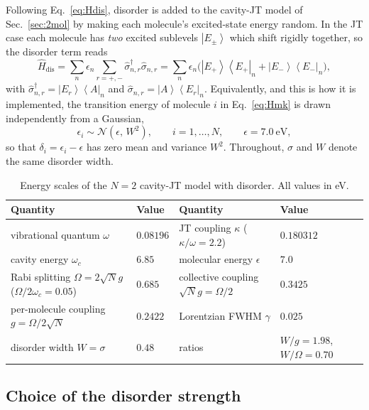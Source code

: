 \documentclass[12pt,a4paper]{article}
\newcommand{\ket}[1]{\left|#1\right\rangle}
\newcommand{\bra}[1]{\left\langle#1\right|}
\begin{document}
Following Eq.~\eqref{eq:Hdis}, disorder is added to the cavity-JT model of
Sec.~\ref{sec:2mol} by making each molecule's excited-state energy random. In
the JT case each molecule has \emph{two} excited sublevels $\ket{E_\pm}$
which shift rigidly together, so the disorder term reads
\begin{equation}
  \hat H_{\mathrm{dis}}=\sum_{n}\epsilon_n\sum_{r=+,-}
    \hat\sigma^\dagger_{n,r}\hat\sigma_{n,r}
  =\sum_n\epsilon_n\big(\ket{E_+}\bra{E_+}_n+\ket{E_-}\bra{E_-}_n\big),
  \label{eq:Hdis_JT}
\end{equation}
with $\hat\sigma^\dagger_{n,r}=\ket{E_r}\bra{A}_n$ and
$\hat\sigma_{n,r}=\ket{A}\bra{E_r}_n$. Equivalently, and this is how it is
implemented, the transition energy of molecule $i$ in Eq.~\eqref{eq:Hmk} is drawn
independently from a Gaussian,
\begin{equation}
  \epsilon_i\sim\mathcal N\!\left(\epsilon,\,W^2\right),\qquad i=1,\dots,N,
  \qquad \epsilon=7.0~\mathrm{eV},
  \label{eq:gauss}
\end{equation}
so that $\delta_i=\epsilon_i-\epsilon$ has zero mean and variance $W^2$.
Throughout, $\sigma$ and $W$ denote the same disorder width.

\begin{table}[t]
\centering
\caption{Energy scales of the $N=2$ cavity-JT model with disorder. All values
in eV.}
\label{tab:scales}
\scriptsize
\begin{tabular}{@{}llll@{}}
\toprule
Quantity & Value & Quantity & Value\\
\midrule
vibrational quantum $\omega$ & $0.08196$ & JT coupling $\kappa$ ($\kappa/\omega=2.2$) & $0.180312$\\
cavity energy $\omega_c$ & $6.85$ & molecular energy $\epsilon$ & $7.0$\\
Rabi splitting $\Omega=2\sqrt N g$ ($\Omega/2\omega_c=0.05$) & $0.685$ & collective coupling $\sqrt N g=\Omega/2$ & $0.3425$\\
per-molecule coupling $g=\Omega/2\sqrt N$ & $0.2422$ & Lorentzian FWHM $\gamma$ & $0.025$\\
disorder width $W=\sigma$ & $0.48$ & ratios & $W/g=1.98$, $W/\Omega=0.70$\\
\bottomrule
\end{tabular}
\end{table}

\subsection{Choice of the disorder strength}
\end{document}
